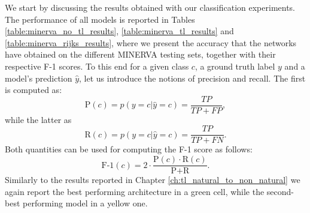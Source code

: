 We start by discussing the results obtained with our classification experiments. The performance of all models is reported in Tables \ref{table:minerva_no_tl_results}, \ref{table:minerva_tl_results} and \ref{table:minerva_rijks_results}, where we present the accuracy that the networks have obtained on the different MINERVA testing sets, together with their respective F-1 scores. To this end for a given class $c$, a ground truth label $y$ and a model's prediction $\hat{y}$, let us introduce the notions of precision and recall. The first is computed as:
\begin{equation}
	\text{P}(c)=p(y=c|\hat{y}=c)=\frac{TP}{TP+FP},
\end{equation}
while the latter as
\begin{equation}
	\text{R}(c)=p(y=c|\hat{y}=c)=\frac{TP}{TP+FN}.
\end{equation}
Both quantities can be used for computing the F-1 score as follows:
\begin{equation}
	\text{F-1}(c)=2 \cdot \frac{\text{P}(c)\cdot\text{R}(c)}{\text{P}+\text{R}}.
\end{equation}
Similarly to the results reported in Chapter \ref{ch:tl_natural_to_non_natural} we again report the best performing architecture in a green cell, while the second-best performing model in a yellow one.  

